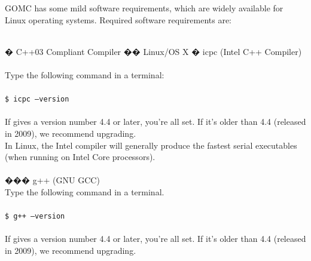 GOMC has some mild software requirements, which are widely available for Linux operating systems.  Required software requirements are:\\\\
\begin{easylist}[articletoc]
� C++03 Compliant Compiler
�� Linux/OS X
� icpc (Intel C++ Compiler)\\\\
Type the following command in a terminal: \\\\
\texttt{\$ icpc --version} \\\\
If gives a version number 4.4 or later, you're all set.  If it's older than 4.4 (released in 2009), we recommend upgrading. \\
In Linux, the Intel compiler will generally produce the fastest serial executables (when running on Intel Core processors). \\\\
��� g++ (GNU GCC) \\
Type the following command in a terminal.\\\\
\texttt{\$ g++ --version}\\\\
If gives a version number 4.4 or later, you're all set. If it's older than 4.4 (released in 2009), we recommend upgrading.


\end{easylist}

